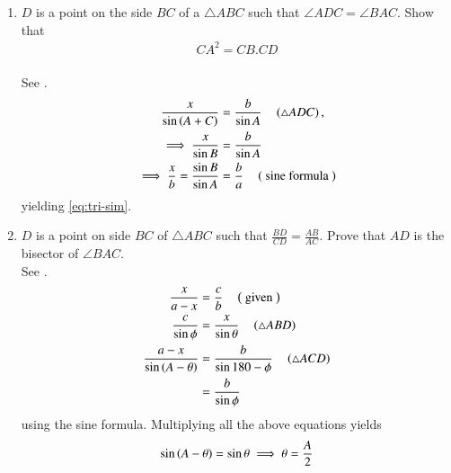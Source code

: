 \begin{enumerate}[label=\thesubsection.\arabic*.,ref=\thesubsection.\theenumi]

\item  $D$ is a point on the side $BC$ of a $\triangle ABC$ such that  $\angle  ADC =  \angle  BAC$. Show that 
\begin{align}
	\label{eq:tri-sim}	
	CA^2 = CB.CD
\end{align}
%
	\\
		\solution
	See .	
\begin{align}
	\frac{x}{\sin\left(A+C\right)} &= 
	\frac{b}{\sin A}  
\quad 
		\left(\triangle ADC\right),
		\\
	\implies	\frac{x}{\sin B} &= 
	\frac{b}{\sin A}  
	\\
\implies	\frac{x}{b} = 
	\frac{\sin B}{\sin A}  &= 
	\frac{b}{a}  \quad \left(\text{ sine formula }\right)
\end{align}
yielding
	\eqref{eq:tri-sim}.	
\begin{figure}[H]
	\begin{center}
			\resizebox{0.6\columnwidth}{!}{}
	\end{center}
	\caption{}
	\label{fig:tri-sim}	
\end{figure}
\item   $D$ is a point on side $BC$ of  $\triangle  ABC$ such that
$\frac{BD}{CD}= \frac{AB}{AC}  $.  Prove that $AD$ is the bisector of  $\angle  BAC$.
\\
\solution 
	See .	
\begin{align}
	\frac{x}{a-x} &= 
	\frac{c}{b}  \quad \left(\text{ given }\right)
	\\
	\frac{c}{\sin\phi} &= 
	\frac{x}{\sin \theta}  \quad \left(\triangle ABD\right)
	\\
	\frac{a-x}{\sin\left(A-\theta\right)} &= 
	\frac{b}{\sin 180-\phi}  \quad \left(\triangle ACD\right)
	\\
	&=\frac{b}{\sin \phi}
\end{align}
using the sine formula.  Multiplying all the above equations yields
\begin{align}
	\sin \left(A-\theta\right)
	=\sin \theta \implies \theta = \frac{A}{2}
\end{align}
\begin{figure}[H]
	\begin{center}
			\resizebox{0.6\columnwidth}{!}{}
	\end{center}
	\caption{}
	\label{fig:tri-ang-bis}	
\end{figure}

\end{enumerate}
